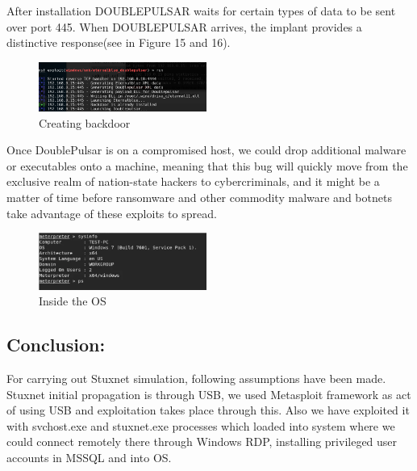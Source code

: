 \documentclass[conference]{IEEEtran}
\begin{document}
After installation DOUBLEPULSAR  waits for certain types of data to be sent over port 445. When DOUBLEPULSAR  arrives, the implant provides a distinctive response(see in Figure 15 and 16).

\begin{figure}[!htb]
	\includegraphics[width=0.49\textwidth]{images/injectiondb.png}
	\caption{Creating backdoor}
	\label{fig:fb}
\end{figure}
 Once DoublePulsar is on a compromised host, we could drop additional malware or executables onto a machine, meaning that this bug will quickly move from the exclusive realm of nation-state hackers to cybercriminals, and it might be a matter of time before ransomware and other commodity malware and botnets take advantage of these exploits to spread.
 \begin{figure}[!htb]
	\includegraphics[width=0.49\textwidth]{images/insidedb.png}
	\caption{Inside the OS}
	\label{fig:fb}
\end{figure}
 
 
 


\subsection{Conclusion:}
For carrying out Stuxnet simulation, following
assumptions have been made.
Stuxnet initial propagation is through USB, we used  Metasploit framework as act of using USB and exploitation takes place through this. Also we have exploited it with svchost.exe and stuxnet.exe processes which loaded into system where we could connect remotely there through Windows RDP, installing privileged user accounts in MSSQL and into OS.

\end{document}
